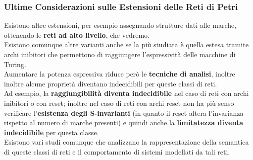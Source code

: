 \documentclass[a4paper,12pt, oneside]{book}
\begin{document}
\subsubsection{Ultime Considerazioni sulle Estensioni delle Reti di Petri}
Esistono altre estensioni, per esempio assegnando strutture dati alle marche,
ottenendo le \textbf{reti ad alto livello}, che vedremo.\\
Esistono comunque altre varianti anche se la più studiata è quella estesa
tramite archi inibitori che permettono di raggiungere l'espressività delle
macchine di Turing.\\
Aumentare la potenza espressiva riduce però le \textbf{tecniche di analisi},
inoltre inoltre alcune proprietà diventano indecidibili per queste classi di
reti.\\
Ad esempio, la \textbf{raggiungibilità diventa indecidibile} nel caso di reti
con archi inibitori o con reset; inoltre nel caso di reti con archi reset non ha
più senso verificare l’\textbf{esistenza degli S-invarianti} (in quanto il reset
altera l'invarianza rispetto al numero di marche presenti) e quindi anche la
\textbf{limitatezza diventa indecidibile} per questa classe.\\
Esistono vari studi comunque che analizzano la rappresentazione della semantica
di queste classi di reti e il comportamento di sistemi modellati da tali reti.
\end{document}
